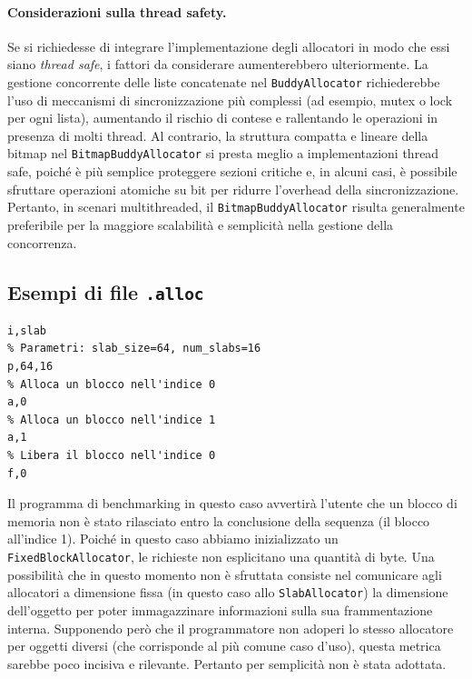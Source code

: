 \paragraph{Considerazioni sulla thread safety.}
Se si richiedesse di integrare l'implementazione degli allocatori in modo che essi siano \textit{thread safe}, i fattori da considerare aumenterebbero ulteriormente. La gestione concorrente delle liste concatenate nel \texttt{BuddyAllocator} richiederebbe l'uso di meccanismi di sincronizzazione più complessi (ad esempio, mutex o lock per ogni lista), aumentando il rischio di contese e rallentando le operazioni in presenza di molti thread. Al contrario, la struttura compatta e lineare della bitmap nel \texttt{BitmapBuddyAllocator} si presta meglio a implementazioni thread safe, poiché è più semplice proteggere sezioni critiche e, in alcuni casi, è possibile sfruttare operazioni atomiche su bit per ridurre l'overhead della sincronizzazione. Pertanto, in scenari multithreaded, il \texttt{BitmapBuddyAllocator} risulta generalmente preferibile per la maggiore scalabilità e semplicità nella gestione della concorrenza.

\pagebreak

\subsection{Esempi di file \texttt{.alloc}}
\begin{lstlisting}[language={}]
% Tipo di allocatore (Slab)
i,slab         
% Parametri: slab_size=64, num_slabs=16
p,64,16        
% Alloca un blocco nell'indice 0
a,0            
% Alloca un blocco nell'indice 1
a,1            
% Libera il blocco nell'indice 0
f,0      
\end{lstlisting}      

Il programma di benchmarking in questo caso avvertirà l'utente che un blocco di memoria non è stato rilasciato entro la conclusione della sequenza (il blocco all'indice 1). Poiché in questo caso abbiamo inizializzato un \texttt{FixedBlockAllocator}, le richieste non esplicitano una quantità di byte. Una possibilità che in questo momento non è sfruttata consiste nel comunicare agli allocatori a dimensione fissa (in questo caso allo \texttt{SlabAllocator}) la dimensione dell'oggetto per poter immagazzinare informazioni sulla sua frammentazione interna. Supponendo però che il programmatore non adoperi lo stesso allocatore per oggetti diversi (che corrisponde al più comune caso d'uso), questa metrica sarebbe poco incisiva e rilevante. Pertanto per semplicità non è stata adottata.

